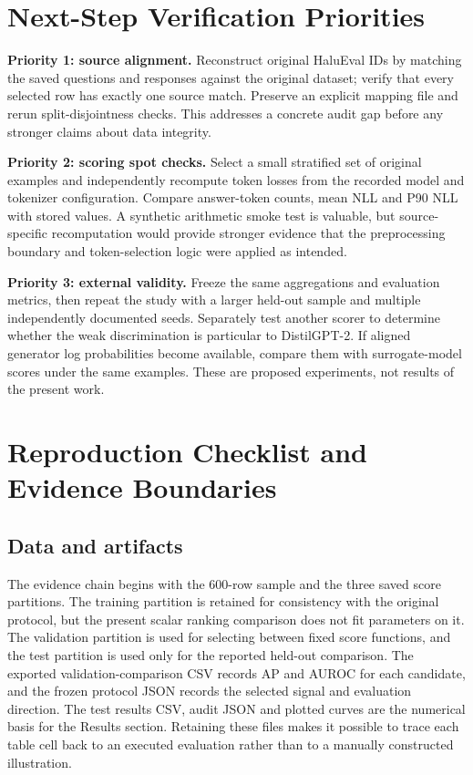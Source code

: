 \documentclass[manuscript,screen]{acmart}
\begin{document}
\section{Next-Step Verification Priorities}
\textbf{Priority 1: source alignment.} Reconstruct original HaluEval IDs by matching the saved questions and responses against the original dataset; verify that every selected row has exactly one source match. Preserve an explicit mapping file and rerun split-disjointness checks. This addresses a concrete audit gap before any stronger claims about data integrity.

\textbf{Priority 2: scoring spot checks.} Select a small stratified set of original examples and independently recompute token losses from the recorded model and tokenizer configuration. Compare answer-token counts, mean NLL and P90 NLL with stored values. A synthetic arithmetic smoke test is valuable, but source-specific recomputation would provide stronger evidence that the preprocessing boundary and token-selection logic were applied as intended.

\textbf{Priority 3: external validity.} Freeze the same aggregations and evaluation metrics, then repeat the study with a larger held-out sample and multiple independently documented seeds. Separately test another scorer to determine whether the weak discrimination is particular to DistilGPT-2. If aligned generator log probabilities become available, compare them with surrogate-model scores under the same examples. These are proposed experiments, not results of the present work.


\section{Reproduction Checklist and Evidence Boundaries}
\subsection{Data and artifacts}
The evidence chain begins with the 600-row sample and the three saved score partitions. The training partition is retained for consistency with the original protocol, but the present scalar ranking comparison does not fit parameters on it. The validation partition is used for selecting between fixed score functions, and the test partition is used only for the reported held-out comparison. The exported validation-comparison CSV records AP and AUROC for each candidate, and the frozen protocol JSON records the selected signal and evaluation direction. The test results CSV, audit JSON and plotted curves are the numerical basis for the Results section. Retaining these files makes it possible to trace each table cell back to an executed evaluation rather than to a manually constructed illustration.
\end{document}
